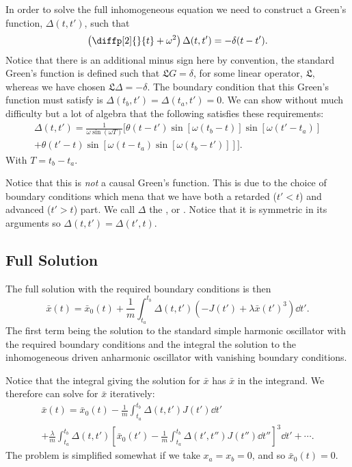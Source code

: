 \documentclass[fleqn]{NotesClass}
\begin{document}
    In order to solve the full inhomogeneous equation we need to construct a Green's function, \(\Delta(t, t')\), such that
    \begin{equation}
        \left( \diffp[2]{}{t} + \omega^2 \right)\Delta(t, t') = -\delta(t - t').
    \end{equation}
    Notice that there is an additional minus sign here by convention, the standard Green's function is defined such that \(\mathfrak{L}G = \delta\), for some linear operator, \(\mathfrak{L}\), whereas we have chosen \(\mathfrak{L}\Delta = -\delta\).
    The boundary condition that this Green's function must satisfy is \(\Delta(t_b, t') = \Delta(t_a, t') = 0\).
    We can show without much difficulty but a lot of algebra that the following satisfies these requirements:
    \begin{multline}\label{eqn:driven SHO Greens function}
        \Delta(t, t') = \frac{1}{\omega\sin(\omega T)} [\theta(t - t')\sin[\omega(t_b - t)]\sin[\omega(t' - t_a)]\\
        + \theta(t' - t)\sin[\omega(t - t_a)\sin[\omega(t_b - t')]]].
    \end{multline}
    With \(T = t_b - t_a\).
    
    Notice that this is \emph{not} a causal Green's function.
    This is due to the choice of boundary conditions which mena that we have both a retarded (\(t' < t\)) and advanced (\(t' > t\)) part.
    We call \(\Delta\) the , or .
    Notice that it is symmetric in its arguments so \(\Delta(t, t') = \Delta(t', t)\).
    
    \subsection{Full Solution}
    The full solution with the required boundary conditions is then
    \begin{equation}
        \bar{x}(t)= \bar{x}_0(t) + \frac{1}{m} \int_{t_a}^{t_b} \Delta(t, t')(-J(t') + \lambda\bar{x}(t')^3) \dd{t'}.
    \end{equation}
    The first term being the solution to the standard simple harmonic oscillator with the required boundary conditions and the integral the solution to the inhomogeneous driven anharmonic oscillator with vanishing boundary conditions.
    
    Notice that the integral giving the solution for \(\bar{x}\) has \(\bar{x}\) in the integrand.
    We therefore can solve for \(\bar{x}\) iteratively:
    \begin{multline}
        \bar{x}(t) = \bar{x}_0(t) - \frac{1}{m} \int_{t_a}^{t_b} \Delta(t, t') J(t') \dd{t'}\\
        + \frac{\lambda}{m} \int_{t_a}^{t_b} \Delta(t, t')\left[ \bar{x}_0(t') - \frac{1}{m}\int_{t_a}^{t_b} \Delta(t', t'')J(t'') \dd{t''} \right]^3 \dd{t'} + \dotsb.
    \end{multline}
    The problem is simplified somewhat if we take \(x_a = x_b = 0\), and so \(\bar{x}_0(t) = 0\).
    
\end{document}
